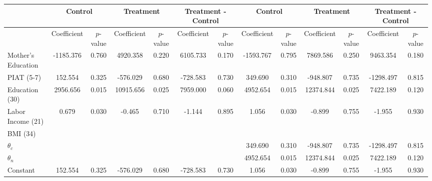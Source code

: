 \begin{tabular}{lcccccccccccc} \toprule
&\multicolumn{2}{c}{Control} & \multicolumn{2}{c}{Treatment} & \multicolumn{2}{c}{Treatment - Control} & \multicolumn{2}{c}{Control} & \multicolumn{2}{c}{Treatment} & \multicolumn{2}{c}{Treatment - Control} \\ \midrule
 & Coefficient  & $p$-value  & Coefficient  & $p$-value & Coefficient  & $p$-value  & Coefficient  & $p$-value  & Coefficient  & $p$-value  & Coefficient  & $p$-value \\ \midrule
Mother's Education & -1185.376 &     0.760 &  4920.358 &     0.220 &  6105.733 &     0.170 & -1593.767 &     0.795 &  7869.586 &     0.250 &  9463.354 &     0.180 \\  
PIAT (5-7) &   152.554 &     0.325 &  -576.029 &     0.680 &  -728.583 &     0.730 &   349.690 &     0.310 &  -948.807 &     0.735 & -1298.497 &     0.815 \\  
Education (30)  &  2956.656 &     0.015 & 10915.656 &     0.025 &  7959.000 &     0.060 &  4952.654 &     0.015 & 12374.844 &     0.025 &  7422.189 &     0.120 \\  
Labor Income (21) &     0.679 &     0.030 &    -0.465 &     0.710 &    -1.144 &     0.895 &     1.056 &     0.030 &    -0.899 &     0.755 &    -1.955 &     0.930 \\  
BMI (34) &        &        &        &        &        &        &        &        &        &        &        &         \\
$\theta_{c}$ &        &        &        &        &        &        &   349.690 &     0.310 &  -948.807 &     0.735 & -1298.497 &     0.815 \\  
$\theta_{n}$ &        &        &        &        &        &        &  4952.654 &     0.015 & 12374.844 &     0.025 &  7422.189 &     0.120 \\  
Constant &   152.554 &     0.325 &  -576.029 &     0.680 &  -728.583 &     0.730 &     1.056 &     0.030 &    -0.899 &     0.755 &    -1.955 &     0.930 \\  
\bottomrule \end{tabular}